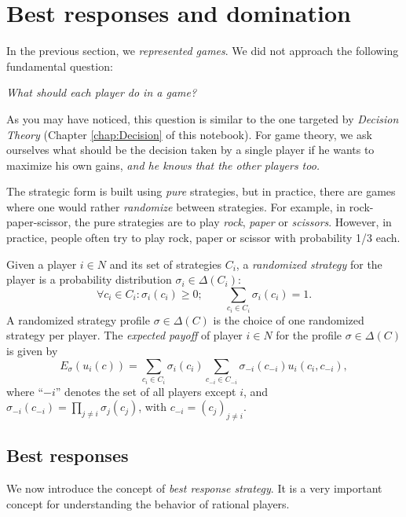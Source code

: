 \section{Best responses and domination}

In the previous section, we \emph{represented games}. We did not approach the following fundamental question:
\begin{center}
 \textit{What should each player do in a game?} 
 \end{center}

As you may have noticed, this question is similar to the one targeted by \emph{Decision Theory} (Chapter \ref{chap:Decision} of this notebook). For game theory, we ask ourselves what should be the decision taken by a single player if he wants to maximize his own gains, \emph{and he knows that the other players too.}



The strategic form is built using \emph{pure} strategies, but in practice, there are games where one would rather \emph{randomize} between strategies. For example,  in rock-paper-scissor, the pure strategies are to play \emph{rock},  \emph{paper} or \emph{scissors}. However, in practice, people often try to play rock, paper or scissor with probability 1/3 each.

\begin{definition}
Given a player $i \in N$ and its set of strategies $C_i$, a \emph{randomized strategy} for the player is a probability distribution $\sigma_i \in \Delta(C_i)$:
$$ \forall c_i \in C_i: \sigma_i(c_i) \geq 0; \qquad \sum_{c_i \in C_i} \sigma_i(c_i) = 1.$$
A randomized strategy profile $\sigma \in \Delta(C)$ is the choice of one randomized strategy per player.
The \emph{expected payoff} of player $i \in N$ for the profile $\sigma \in \Delta(C)$ is given by 
$$E_\sigma(u_i(c)) = \sum_{c_i \in C_i} \sigma_i(c_i) \sum_{c_{-i} \in C_{-i}} \sigma_{-i}(c_{-i}) u_i(c_i, c_{-i}), $$
where ``$-i$'' denotes the set of all players except $i$, and 
$\sigma_{-i}(c_{-i}) = \prod_{j \neq i}\sigma_{j}(c_j)$, with $c_{-i} = (c_j)_{j \neq i}$. 
\end{definition}

\subsection{Best responses}
\label{chap2:subsec:BR}
We now introduce the concept of \emph{best response strategy}. It is a very important concept for understanding the behavior of rational players.

